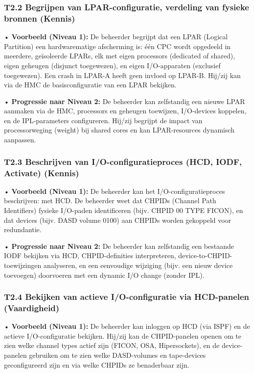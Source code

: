 \subsubsection{T2.2 Begrijpen van LPAR-configuratie, verdeling van fysieke bronnen (Kennis)}

• \textbf{Voorbeeld (Niveau 1):} De beheerder begrijpt dat een LPAR (Logical Partition) een hardwarematige afscherming is: één CPC wordt opgedeeld in meerdere, geïsoleerde LPARs, elk met eigen processors (dedicated of shared), eigen geheugen (disjunct toegewezen), en eigen I/O-apparaten (exclusief toegewezen). Een crash in LPAR-A heeft geen invloed op LPAR-B. Hij/zij kan via de HMC de basisconfiguratie van een LPAR bekijken.

• \textbf{Progressie naar Niveau 2:} De beheerder kan zelfstandig een nieuwe LPAR aanmaken via de HMC, processors en geheugen toewijzen, I/O-devices koppelen, en de IPL-parameters configureren. Hij/zij begrijpt de impact van processorweging (weight) bij shared cores en kan LPAR-resources dynamisch aanpassen.

\subsubsection{T2.3 Beschrijven van I/O-configuratieproces (HCD, IODF, Activate) (Kennis)}

• \textbf{Voorbeeld (Niveau 1):} De beheerder kan het I/O-configuratieproces beschrijven: met HCD. De beheerder weet dat CHPIDs (Channel Path Identifiers) fysieke I/O-paden identificeren (bijv. CHPID 00 TYPE FICON), en dat devices (bijv. DASD volume 0100) aan CHPIDs worden gekoppeld voor redundantie.

• \textbf{Progressie naar Niveau 2:} De beheerder kan zelfstandig een bestaande IODF bekijken via HCD, CHPID-definities interpreteren, device-to-CHPID-toewijzingen analyseren, en een eenvoudige wijziging (bijv. een nieuw device toevoegen) doorvoeren met een dynamic I/O change (zonder IPL).

\subsubsection{T2.4 Bekijken van actieve I/O-configuratie via HCD-panelen (Vaardigheid)}

• \textbf{Voorbeeld (Niveau 1):} De beheerder kan inloggen op HCD (via ISPF) en de actieve I/O-configuratie bekijken. Hij/zij kan de CHPID-panelen openen om te zien welke channel types actief zijn (FICON, OSA, Hipersockets), en de device-panelen gebruiken om te zien welke DASD-volumes en tape-devices geconfigureerd zijn en via welke CHPIDs ze benaderbaar zijn.

